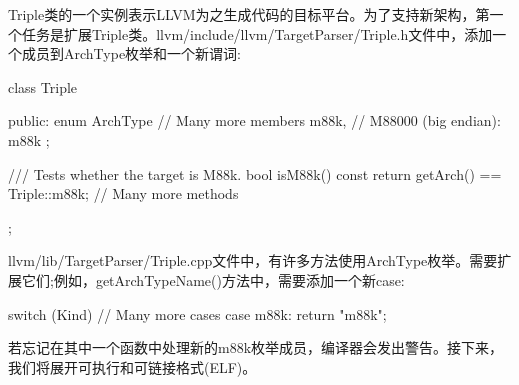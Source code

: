 Triple类的一个实例表示LLVM为之生成代码的目标平台。为了支持新架构，第一个任务是扩展Triple类。llvm/include/llvm/TargetParser/Triple.h文件中，添加一个成员到ArchType枚举和一个新谓词:

\begin{cpp}
class Triple {
public:
    enum ArchType {
        // Many more members
        m88k, // M88000 (big endian): m88k
    };

    /// Tests whether the target is M88k.
    bool isM88k() const {
        return getArch() == Triple::m88k;
    }
    // Many more methods
};
\end{cpp}

llvm/lib/TargetParser/Triple.cpp文件中，有许多方法使用ArchType枚举。需要扩展它们;例如，getArchTypeName()方法中，需要添加一个新case:

\begin{cpp}
switch (Kind) {
    // Many more cases
    case m88k: return "m88k";
}
\end{cpp}

若忘记在其中一个函数中处理新的m88k枚举成员，编译器会发出警告。接下来，我们将展开可执行和可链接格式(ELF)。

































